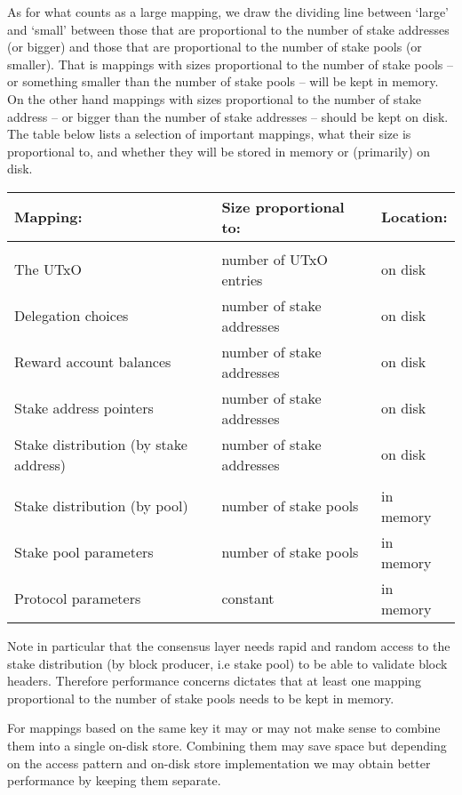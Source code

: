 \documentclass[11pt,a4paper]{article}
\begin{document}
As for what counts as a large mapping, we draw the dividing line between
`large' and `small' between those that are proportional to the number of stake
addresses (or bigger) and those that are proportional to the number of stake
pools (or smaller). That is mappings with sizes proportional to the number of stake pools -- or something smaller than the number of stake pools -- will be
kept in memory. On the other hand mappings with sizes proportional to the
number of stake address -- or bigger than the number of stake addresses --
should be kept on disk. The table below lists a selection of important
mappings, what their size is proportional to, and whether they will be stored
in memory or (primarily) on disk.
\begin{center}
\begin{tabular}{lll}
Mapping: & Size proportional to: & Location: \\
\hline \hline \\
The UTxO                              & number of UTxO entries    & on disk \\
Delegation choices                    & number of stake addresses & on disk \\
Reward account balances               & number of stake addresses & on disk \\
Stake address pointers                & number of stake addresses & on disk \\
Stake distribution (by stake address) & number of stake addresses & on disk \\
\hline \\
Stake distribution (by pool)          & number of stake pools & in memory \\
Stake pool parameters                 & number of stake pools & in memory \\
Protocol parameters                   & constant              & in memory
\end{tabular}
\end{center}
Note in particular that the consensus layer needs rapid and random access to
the stake distribution (by block producer, i.e stake pool) to be able to
validate block headers. Therefore performance concerns dictates that at least
one mapping proportional to the number of stake pools needs to be kept in
memory.

For mappings based on the same key it may or may not make sense to combine them
into a single on-disk store. Combining them may save space but depending on the
access pattern and on-disk store implementation we may obtain better
performance by keeping them separate.
\end{document}
